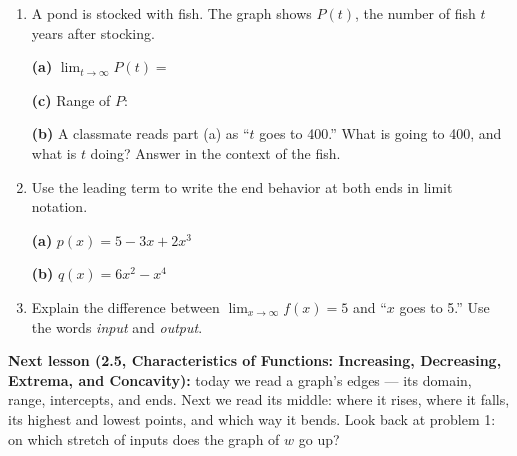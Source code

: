 \documentclass[10pt]{article}
\begin{document}
\begin{enumerate}[leftmargin=1.9em, itemsep=9pt, start=8]

\item \begin{minipage}[t]{0.5\linewidth}
      A pond is stocked with fish. The graph shows $P(t)$, the number of fish $t$ years
      after stocking.

      \medskip
      \textbf{(a)} $\displaystyle\lim_{t \to \infty} P(t) = $ \blank{1.6cm}

      \medskip
      \textbf{(c)} Range of $P$: \blank{2.4cm}
      \end{minipage}\hfill
      \begin{minipage}[t]{0.45\linewidth}
      \vspace{0pt}
      \centering
      \end{minipage}

      \textbf{(b)} A classmate reads part (a) as ``$t$ goes to 400.'' What is going to 400, and
      what is $t$ doing? Answer in the context of the fish.
      \writespace{1.5cm}{}

\item Use the leading term to write the end behavior at both ends in limit notation.

      \textbf{(a)} $p(x) = 5 - 3x + 2x^3$ \quad \blank{6.6cm}

      \textbf{(b)} $q(x) = 6x^2 - x^4$ \quad \blank{6.6cm}

\item Explain the difference between $\displaystyle\lim_{x \to \infty} f(x) = 5$ and
      ``$x$ goes to 5.'' Use the words \emph{input} and \emph{output}.
      \writespace{1.6cm}{}

\end{enumerate}

\vspace{0.06in}

\boxguard[8]
\begin{spiralbox}
\small
\textbf{Next lesson (2.5, Characteristics of Functions: Increasing, Decreasing, Extrema, and
Concavity):} today we read a graph's edges --- its domain, range, intercepts, and ends. Next we
read its middle: where it rises, where it falls, its highest and lowest points, and which way it
bends. Look back at problem 1: on which stretch of inputs does the graph of $w$ go up?
\end{spiralbox}
\end{document}
